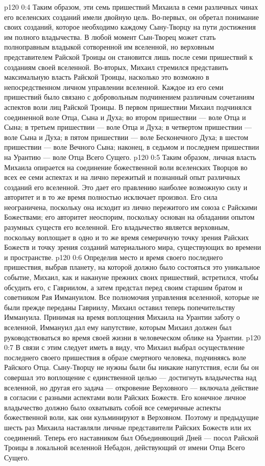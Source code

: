 \vs p120 0:4 Таким образом, эти семь пришествий Михаила в семи различных чинах его вселенских созданий имели двойную цель. Во\hyp{}первых, он обретал понимание своих созданий, которое необходимо каждому Сыну\hyp{}Творцу на пути достижения им полного владычества. В любой момент Сын\hyp{}Творец может стать полноправным владыкой сотворенной им вселенной, но верховным представителем Райской Троицы он становится лишь после семи пришествий к созданиям своей вселенной. Во\hyp{}вторых, Михаил стремился представить максимальную власть Райской Троицы, насколько это возможно в непосредственном личном управлении вселенной. Каждое из его семи пришествий было связано с добровольным подчинением различным сочетаниям аспектов воли лиц Райской Троицы. В первом пришествии Михаил подчинялся соединенной воле Отца, Сына и Духа; во втором пришествии --- воле Отца и Сына; в третьем пришествии --- воле Отца и Духа; в четвертом пришествии --- воле Сына и Духа; в пятом пришествии --- воле Бесконечного Духа; в шестом пришествии --- воле Вечного Сына; наконец, в седьмом и последнем пришествии на Урантию --- воле Отца Всего Сущего.
\vs p120 0:5 Таким образом, личная власть Михаила опирается на соединение божественной воли вселенских Творцов во всех ее семи аспектах и на лично пережитый и познанный опыт различных созданий его вселенной. Это дает его правлению наиболее возможную силу и авторитет и в то же время полностью исключает произвол. Его сила неограничена, поскольку она исходит из лично пережитого им союза с Райскими Божествами; его авторитет неоспорим, поскольку основан на обладании опытом разумных существ его вселенной. Его владычество является верховным, поскольку воплощает в одно и то же время семеричную точку зрения Райских Божеств и точку зрения созданий материального мира, существующих во времени и пространстве.
\vs p120 0:6 \pc Определив место и время своего последнего пришествия, выбрав планету, на которой должно было состояться это уникальное событие, Михаил, как и накануне прежних своих пришествий, встретился, чтобы обсудить его, с Гавриилом, а затем предстал перед своим старшим братом и советником Рая Иммануилом. Все полномочия управления вселенной, которые не были прежде переданы Гавриилу, Михаил оставил теперь попечительству Иммануила. Принимая на время воплощения Михаила на Урантии заботу о вселенной, Иммануил дал ему напутствие, которым Михаил должен был руководствоваться во время своей жизни в человеческом облике на Урантии.
\vs p120 0:7 \pc В связи с этим следует иметь в виду, что Михаил выбрал осуществление последнего своего пришествия в образе смертного человека, подчиняясь воле Райского Отца. Сыну\hyp{}Творцу не нужны были бы никакие напутствия, если бы он совершал это воплощение с единственной целью --- достигнуть владычества над вселенной, но другая его задача --- откровение Верховного --- включала действие в согласии с разными аспектами воли Райских Божеств. Его конечное личное владычество должно было охватывать собой все семеричные аспекты божественной воли, как они кульминируют в Верховном. Поэтому и предыдущие шесть раз Михаила наставляли личные представители Райских Божеств или их соединений. Теперь его наставником был Объединяющий Дней --- посол Райской Троицы в локальной вселенной Небадон, действующий от имени Отца Всего Сущего.
